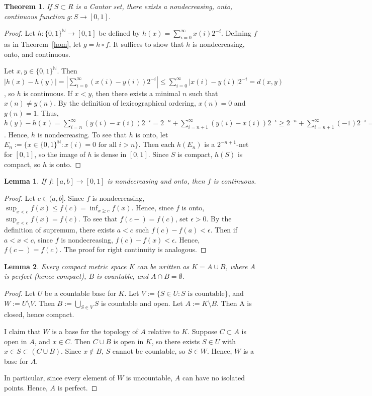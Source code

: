 \documentclass{article}
\newtheorem{theorem}{Theorem}
\newtheorem{lemma}{Lemma}
\newcommand{\N}{\mathbb{N}}
\begin{document}
\begin{theorem}\label{cfunction}
If $S \subset R$ is a Cantor set, there exists a nondecreasing, onto, continuous function $g:S \rightarrow [0,1]$.
\end{theorem}
\begin{proof}
Let $h:{\{0,1\}}^\N \rightarrow [0,1]$ be defined by $h(x) = \sum_{i=0}^\infty x(i)2^{-i}$. Defining $f$ as in Theorem~\ref{hom}, let $g = h \circ f$. It suffices to show that $h$ is nondecreasing, onto, and continuous.

Let $x,y \in {\{0,1\}}^\N$. Then $|h(x) - h(y)| = |\sum_{i=0}^\infty (x(i)-y(i))2^{-i}| \leq \sum_{i=0}^\infty |x(i)-y(i)|2^{-i} = d(x,y)$, so $h$ is continuous. If $x<y$, then there exists a minimal $n$ such that $x(n) \neq y(n)$. By the definition of lexicographical ordering, $x(n) = 0$ and $y(n) = 1$.  Thus, $h(y) - h(x) = \sum_{i=n}^\infty (y(i)-x(i))2^{-i} = 2^{-n} + \sum_{i=n+1}^\infty (y(i)-x(i))2^{-i} \geq 2^{-n} + \sum_{i=n+1}^\infty (-1)2^{-i} = 0$. Hence, $h$ is nondecreasing. To see that $h$ is onto, let $E_n := \{x \in {\{0,1\}}^\N : x(i) = 0 \text{ for all } i>n\}$. Then each $h(E_n)$ is a $2^{-n+1}$-net for $[0,1]$, so the image of $h$ is dense in $[0,1]$.  Since $S$ is compact, $h(S)$ is compact, so $h$ is onto.
\end{proof}



\begin{lemma}\label{continuous}
If $f:[a,b] \rightarrow [0,1]$ is nondecreasing and onto, then $f$ is continuous.
\end{lemma}
\begin{proof}
Let $c \in (a,b]$.  Since $f$ is nondecreasing, $\sup_{x < c} {f(x)} \leq f(c) = \inf_{x \geq c} {f(x)}$. Hence, since $f$ is onto, $\sup_{x < c} {f(x)} = f(c)$.
To see that $f(c-) = f(c)$, set $\epsilon > 0$. By the definition of supremum, there exists $a<c$ such $f(c) - f(a) < \epsilon$. Then if $a<x<c$, since $f$ is nondecreasing, 
$f(c) - f(x) < \epsilon$. Hence, $f(c-) = f(c)$.  The proof for right continuity is analogous.
\end{proof}

\begin{lemma}\label{split}
Every compact metric space K can be written as 
$K = A \cup B$, where $A$ is perfect (hence compact), $B$ is countable, and $A \cap B = \emptyset$.
\end{lemma}
\begin{proof}
Let $U$ be a countable base for $K$. Let $V := \{S \in U : S \text{ is countable}\}$, and $W := U \setminus V$. Then $B:= \bigcup_{S\in V}{S}$ is countable and open.
Let $A:= K\setminus B$. Then A is closed, hence compact. 

I claim that $W$ is a base for the topology of $A$ relative to $K$.  Suppose $C \subset A$ is open in $A$, and $x \in C$. Then $C \cup B$ is open in $K$, so there exists $S \in U$ with $x \in S \subset (C \cup B)$. Since $x \notin B$, $S$ cannot be countable, so $S \in W$. Hence, $W$ is a base for $A$.

In particular, since every element of $W$ is uncountable, $A$ can have no isolated points. Hence, $A$ is perfect.
\end{proof}
\end{document}
